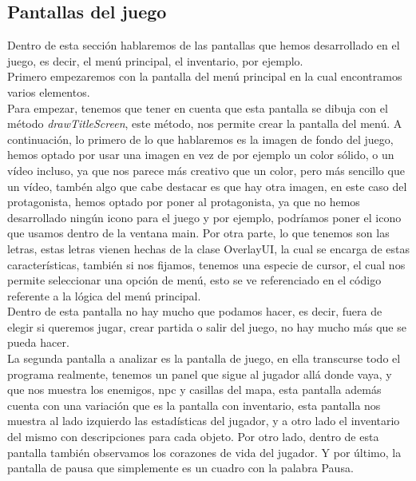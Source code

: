 \documentclass[a4paper]{article}
\begin{document}
\clearpage

\subsection{Pantallas del juego}
Dentro de esta sección hablaremos de las pantallas que hemos desarrollado en el juego, es decir, el menú principal, el inventario, por ejemplo.\\
Primero empezaremos con la pantalla del menú principal en la cual encontramos varios elementos.\\
Para empezar, tenemos que tener en cuenta que esta pantalla se dibuja con el método \textit{drawTitleScreen}, este método, nos permite crear la pantalla del menú. A continuación, lo primero de lo que hablaremos es la imagen de fondo del juego, hemos optado por usar una imagen en vez de por ejemplo un color sólido, o un vídeo incluso, ya que nos parece más creativo que un color, pero más sencillo que un vídeo, tambén algo que cabe destacar es que hay otra imagen, en este caso del protagonista, hemos optado por poner al protagonista, ya que no hemos
desarrollado ningún icono para el juego y por ejemplo, podríamos poner el icono que usamos dentro de la ventana main. Por otra parte, lo que tenemos son las letras, estas letras vienen hechas de la clase OverlayUI, la cual se encarga de estas características, también si nos fijamos, tenemos una especie de cursor, el cual nos permite seleccionar una opción de menú, esto se ve referenciado en el código referente a la lógica del menú principal.\\
Dentro de esta pantalla no hay mucho que podamos hacer, es decir, fuera de elegir si queremos jugar, crear partida o salir del juego, no hay mucho más que se pueda hacer.\\

La segunda pantalla a analizar es la pantalla de juego, en ella transcurse todo el programa realmente, tenemos un panel que sigue al jugador allá donde vaya, y que nos muestra los enemigos, npc y casillas del mapa, esta pantalla además cuenta con una variación que es la pantalla con inventario, esta pantalla nos muestra al lado izquierdo las estadísticas del jugador, y a otro lado el inventario del mismo con descripciones para cada objeto.
Por otro lado, dentro de esta pantalla también observamos los corazones de vida del jugador. Y por último, la pantalla de pausa que simplemente es un cuadro con la palabra Pausa.


\clearpage
\end{document}
